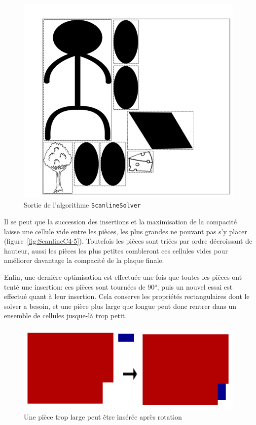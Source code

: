 \begin{figure}[!htb]
\centering
\includegraphics[scale=0.5]{img/ScanlineC6.png}
\caption{Sortie de l'algorithme \texttt{ScanlineSolver}}
\label{fig:ScanlineC6}
\end{figure}

\newpage
\indent Il se peut que la succession des insertions et la maximisation de la compacité laisse une cellule vide entre les pièces, les plus grandes ne pouvant pas s'y placer (figure~\ref{fig:ScanlineC4-5}). Toutefois les pièces sont triées par ordre décroissant de hauteur, aussi les pièces les plus petites combleront ces cellules vides pour améliorer davantage la compacité de la plaque finale.

\newpage
Enfin, une dernière optimisation est effectuée une fois que toutes les pièces ont tenté une insertion: ces pièces sont tournées de 90°, puis un nouvel essai est effectué quant à leur insertion. Cela conserve les propriétés rectangulaires dont le solver a besoin, et une pièce plus large que longue peut donc rentrer dans un ensemble de cellules jusque-là trop petit.

\begin{figure}[!htb]
\centering
\includegraphics[scale=0.5]{img/ScanlineClounk.png}
\caption{Une pièce trop large peut être insérée après rotation}
\label{fig:ScanlineClounk}
\end{figure}


